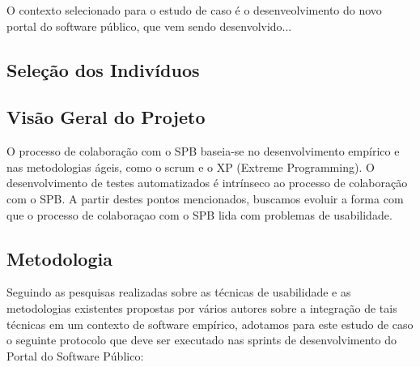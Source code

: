 O contexto selecionado para o estudo de caso é o desenveolvimento do novo portal do software público, que vem sendo desenvolvido...


\subsection{Seleção dos Indivíduos}



\subsection{Visão Geral do Projeto}

O processo de colaboração com o SPB baseia-se no desenvolvimento empírico e nas metodologias ágeis, como o scrum e o XP (Extreme Programming). O desenvolvimento de testes automatizados é intrínseco ao processo de colaboração com o SPB. A partir destes pontos mencionados, buscamos evoluir a forma com que o processo de colaboraçao com o SPB lida com problemas de usabilidade.

\subsection{Metodologia}

	Seguindo as pesquisas realizadas sobre as técnicas de usabilidade e as metodologias existentes propostas por vários autores sobre a integração de tais técnicas em um contexto de software empírico, adotamos para este estudo de caso o seguinte protocolo que deve ser executado nas sprints de desenvolvimento do Portal do Software Público:
	
